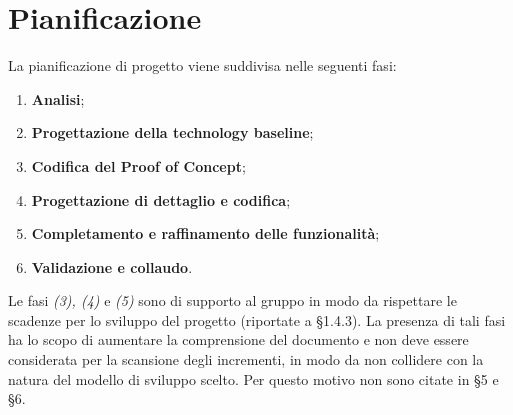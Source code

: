 \section{Pianificazione}
La pianificazione di progetto viene suddivisa nelle seguenti fasi:
\begin{enumerate}

	\item \textbf{Analisi};
	\item \textbf{Progettazione della technology baseline};
	\item \textbf{Codifica del Proof of Concept};
	\item \textbf{Progettazione di dettaglio e codifica};
	\item \textbf{Completamento e raffinamento delle funzionalità};
	\item \textbf{Validazione e collaudo}.
\end{enumerate}

Le fasi \textit{(3), (4)} e \textit{(5)} sono di supporto al gruppo in modo da rispettare le scadenze per lo sviluppo del progetto (riportate a \S 1.4.3). La presenza di tali fasi ha lo scopo di aumentare la comprensione del documento e non deve essere considerata per la scansione degli incrementi, in modo da non collidere con la natura del modello di sviluppo scelto. Per questo motivo non sono citate in \S 5 e \S 6.

\newpage

\newpage

\newpage

\newpage

\newpage
